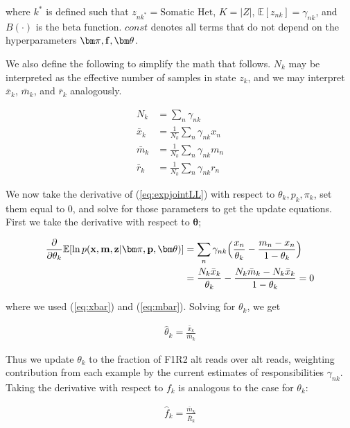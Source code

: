\documentclass[a4paper]{article}
\newcommand{\vf}{{\bf f}}
\newcommand{\vp}{{\bf p}}
\newcommand{\vz}{{\bf z}}
\newcommand{\vm}{{\bf m}}
\newcommand{\vx}{{\bf x}}
\newcommand{\vpi}{{\bm \pi}}
\newcommand{\vtheta}{{\bm \theta}}
\newcommand{\E}{\mathbb{E}}
\begin{document}
where $k^*$ is defined such that $z_{nk^*} = \text{Somatic Het}$, $K = |Z|$, $\E [ z_{nk} ] = \gamma_{nk}$, and $B(\cdot)$ is the beta function. $const$ denotes all terms that do not depend on the hyperparameters $\vpi, \vf, \vtheta$. 

We also define the following to simplify the math that follows. $N_k$ may be interpreted as the effective number of samples in state $z_k$, and we may interpret $\bar{x}_k$, $\bar{m}_k$, and $\bar{r}_k$ analogously.

\begin{align}
N_k      &= \sum_n \gamma_{nk} \label{eq:nk} \\
\bar{x}_k  &= \frac{1}{N_k} \sum_n \gamma_{nk} x_n \label{eq:xbar} \\
\bar{m}_k &= \frac{1}{N_k} \sum_n \gamma_{nk} m_n \label{eq:mbar} \\
\bar{r}_k  &= \frac{1}{N_k} \sum_n \gamma_{nk} r_n \label{eq:rbar}
\end{align}



We now take the derivative of (\ref{eq:expjointLL}) with respect to $\theta_k, p_k, \pi_{k}$, set them equal to 0, and solve for those parameters to get the update equations. First we take the derivative with respect to $\vtheta$;

\begin{align}
\frac{\partial}{\partial \theta_k} \E [ \ln p(\vx, \vm , \vz | \vpi, \vp, \vtheta) ] &= \sum_n \gamma_{nk} \Big( \frac{ x_n}{\theta_k} - \frac{m_n - x_n}{1- \theta_k} \Big)\\
					         							     &= \frac{N_k \bar{x}_k}{\theta_k} - \frac{N_k \bar{m}_k - N_k \bar{x}_k}{1- \theta_k} = 0
\end{align}

where we used (\ref{eq:xbar}) and (\ref{eq:mbar}). Solving for $\theta_k$, we get

\begin{align}
\hat{\theta}_k = \frac{\bar{x}_k}{\bar{m}_k} \label{eq:theta}
\end{align}

Thus we update $\theta_k$ to the fraction of F1R2 alt reads over alt reads, weighting contribution from each example by the current estimates of responsibilities $\gamma_{nk}$. Taking the derivative with respect to $f_k$ is analogous to the case for $\theta_k$:

\begin{align}
\hat{f}_k = \frac{\bar{m}_k}{\bar{R}_k} \label{eq:f}
\end{align}
\end{document}

